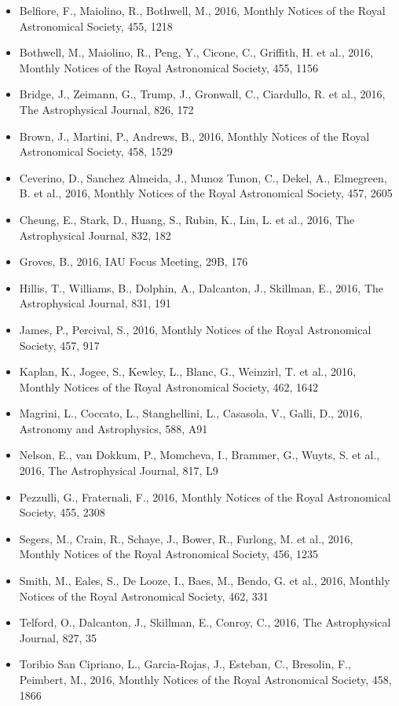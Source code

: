 \documentclass{letter}
\begin{document}
\begin{enumerate}
\begin{itemize}
\item Belfiore, F., Maiolino, R., Bothwell, M., 2016, Monthly Notices of the Royal Astronomical Society, 455, 1218
\item Bothwell, M., Maiolino, R., Peng, Y., Cicone, C., Griffith, H. et al., 2016, Monthly Notices of the Royal Astronomical Society, 455, 1156
\item Bridge, J., Zeimann, G., Trump, J., Gronwall, C., Ciardullo, R. et al., 2016, The Astrophysical Journal, 826, 172
\item Brown, J., Martini, P., Andrews, B., 2016, Monthly Notices of the Royal Astronomical Society, 458, 1529
\item Ceverino, D., Sanchez Almeida, J., Munoz Tunon, C., Dekel, A., Elmegreen, B. et al., 2016, Monthly Notices of the Royal Astronomical Society, 457, 2605
\item Cheung, E., Stark, D., Huang, S., Rubin, K., Lin, L. et al., 2016, The Astrophysical Journal, 832, 182
\item Groves, B., 2016, IAU Focus Meeting, 29B, 176
\item Hillis, T., Williams, B., Dolphin, A., Dalcanton, J., Skillman, E., 2016, The Astrophysical Journal, 831, 191
\item James, P., Percival, S., 2016, Monthly Notices of the Royal Astronomical Society, 457, 917
\item Kaplan, K., Jogee, S., Kewley, L., Blanc, G., Weinzirl, T. et al., 2016, Monthly Notices of the Royal Astronomical Society, 462, 1642
\item Magrini, L., Coccato, L., Stanghellini, L., Casasola, V., Galli, D., 2016, Astronomy and Astrophysics, 588, A91
\item Nelson, E., van Dokkum, P., Momcheva, I., Brammer, G., Wuyts, S. et al., 2016, The Astrophysical Journal, 817, L9
\item Pezzulli, G., Fraternali, F., 2016, Monthly Notices of the Royal Astronomical Society, 455, 2308
\item Segers, M., Crain, R., Schaye, J., Bower, R., Furlong, M. et al., 2016, Monthly Notices of the Royal Astronomical Society, 456, 1235
\item Smith, M., Eales, S., De Looze, I., Baes, M., Bendo, G. et al., 2016, Monthly Notices of the Royal Astronomical Society, 462, 331
\item Telford, O., Dalcanton, J., Skillman, E., Conroy, C., 2016, The Astrophysical Journal, 827, 35
\item Toribio San Cipriano, L., Garcia-Rojas, J., Esteban, C., Bresolin, F., Peimbert, M., 2016, Monthly Notices of the Royal Astronomical Society, 458, 1866

\end{itemize}
\end{enumerate}
\end{document}
